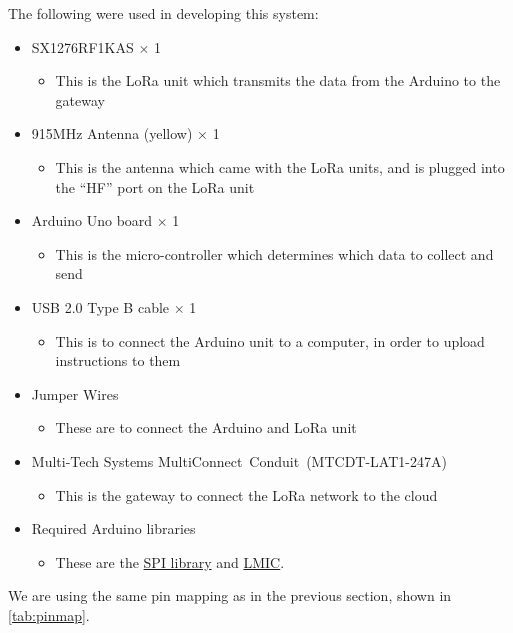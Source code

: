 The following were used in developing this system:
\begin{itemize}
\item SX1276RF1KAS $\times$ 1
  \begin{itemize}
  \item This is the LoRa unit which transmits the data from the Arduino to the gateway
  \end{itemize}
\item 915MHz Antenna (yellow) $\times$ 1
  \begin{itemize}
  \item This is the antenna which came with the LoRa units, and is plugged into the ``HF'' port on the LoRa unit
  \end{itemize}
\item Arduino Uno board $\times$ 1
  \begin{itemize}
  \item This is the micro-controller which determines which data to collect and send
  \end{itemize}
\item USB 2.0 Type B cable $\times$ 1
  \begin{itemize}
  \item This is to connect the Arduino unit to a computer, in order to upload instructions to them
  \end{itemize}
\item Jumper Wires
  \begin{itemize}
  \item These are to connect the Arduino and LoRa unit
  \end{itemize}
\item Multi-Tech Systems MultiConnect\textregistered\ Conduit\texttrademark\ (MTCDT-LAT1-247A)
  \begin{itemize}
  \item This is the gateway to connect the LoRa network to the cloud
  \end{itemize}
\item Required Arduino libraries
  \begin{itemize}
  \item These are the \href{https://www.arduino.cc/en/Reference/SPI}{SPI library} and \href{https://github.com/matthijskooijman/arduino-lmic}{LMIC}.
  \end{itemize}

\end{itemize}

We are using the same pin mapping as in the previous section, shown in \cref{tab:pinmap}.

